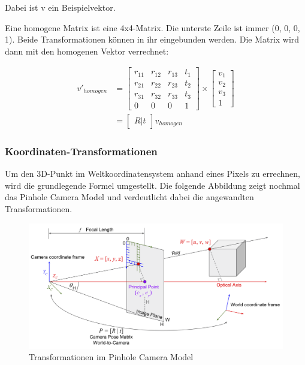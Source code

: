	Dabei ist v ein Beispielvektor.
	
	Eine homogene Matrix ist eine 4x4-Matrix. Die unterste Zeile ist immer (0, 0, 0, 1). Beide Transformationen können in ihr eingebunden werden. Die Matrix wird dann mit den homogenen Vektor verrechnet:
	
	\begin{equation}
	\begin{aligned}
	v'_{homogen} &= \begin{bmatrix}
	r_{11} & r_{12} & r_{13} & t_1 \\
	r_{21} & r_{22} & r_{23} & t_2 \\
	r_{31} & r_{32} & r_{33} & t_3 \\
	0 & 0 & 0 & 1
	\end{bmatrix} \times \begin{bmatrix}
	v_1 \\
	v_2 \\
	v_3 \\
	1
	\end{bmatrix} \\
	&= \begin{bmatrix}
	R|t
	\end{bmatrix} v_{homogen}
	\end{aligned}
	\label{eq:rot_trans_homgen}
	\end{equation}
	
	\newpage
	
	\subsubsection{Koordinaten-Transformationen}
	Um den 3D-Punkt im Weltkoordinatensystem anhand eines Pixels zu errechnen, wird die grundlegende Formel umgestellt. Die folgende Abbildung zeigt nochmal das Pinhole Camera Model und verdeutlicht dabei die angewandten Transformationen.
	
	\begin{figure}[h]
		\centering
		\includegraphics[width=0.9\linewidth]{img/grundlagen/pinhole_camera_model_2.png}
		\caption[Transformationen]{Transformationen im Pinhole Camera Model}
		\label{fig:pinhole-camera-model_transformations}
	\end{figure}
	
